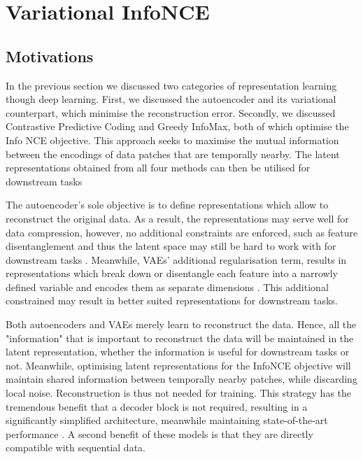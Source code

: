 \chapter{Variational InfoNCE}

\section{Motivations}
	In the previous section we discussed two categories of representation learning though deep learning. First, we discussed the autoencoder and its variational counterpart, which minimise the reconstruction error. Secondly, we discussed Contrastive Predictive Coding and Greedy InfoMax, both of which optimise the Info NCE objective. This approach seeks to maximise the mutual information between the encodings of data patches that are temporally nearby. The latent representations obtained from all four methods can then be utilised for downstream tasks \cite{bengioRepresentationLearningReview2013, weiRecentAdvancesVariational2021, oordRepresentationLearningContrastive2019, lowePuttingEndEndtoEnd2020}
	
		The autoencoder's sole objective is to define representations which allow to reconstruct the original data. As a result, the representations may serve well for data compression, however, no additional constraints are enforced, such as feature disentanglement and thus the latent space may still be hard to work with for downstream tasks \cite{tschannenRecentAdvancesAutoencoderBased2018}. Meanwhile, VAEs' additional regularisation term, results in representations which break down or disentangle each feature into a narrowly defined variable and encodes them as separate dimensions \cite{weiRecentAdvancesVariational2021}. This additional constrained may result in better suited representations for downstream tasks. %

		Both autoencoders and VAEs merely learn to reconstruct the data. Hence, all the "information" that is important to reconstruct the data will be maintained in the latent representation, whether the information is useful for downstream tasks or not. Meanwhile, optimising latent representations for the InfoNCE objective will maintain shared information between temporally nearby patches, while discarding local noise. Reconstruction is thus not needed for training. This strategy has the tremendous benefit that a decoder block is not required, resulting in a significantly simplified architecture, meanwhile maintaining state-of-the-art performance \cite{stackeEvaluationContrastivePredictive2020}. A second benefit of these models is that they are directly compatible with sequential data.
		
